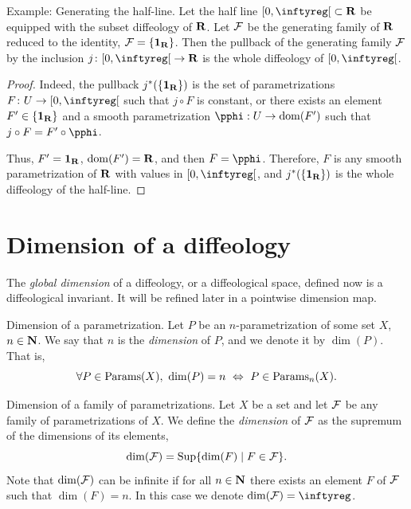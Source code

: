 \begin{Article}{Example: Generating the half-line.}{}
  Let the half line $\LeftClosedInterval{0, \infty} \subset \RR$ be equipped with the subset diffeology of $\mathbf{R}$.
  Let $\mathcal{F}$ be the generating family of $\mathbf{R}$ reduced to the identity,
  $\mathcal{F} = \{{\mathbf{1}}_{\mathbf{R}}\}$.
  Then the pullback of the generating family $\mathcal{F}$ by the inclusion $j \colon \LeftClosedInterval{0, \infty} \to \RR$ is the whole diffeology of $\LeftClosedInterval{0, \infty}$.
\end{Article}

\begin{proof}
  Indeed,
  the pullback $j^*(\{{\mathbf{1}}_{\mathbf{R}}\})$ is the set of parametrizations $F \colon U \to \LeftClosedInterval{0,\infty}$ such that $j \circ F$ is constant,
  or there exists an element $F' \in \{{\mathbf{1}}_{\mathbf{R}}\}$ and a smooth parametrization $\pphi : U \to \Domain(F')$ such that $j \circ F = F' \circ \pphi$.
  
  Thus,
  $F' = {\mathbf{1}}_{\mathbf{R}}$,
  $\mathrm{dom}(F') = \mathbf{R}$, and then $F = \pphi$.
  Therefore,
  $F$ is any smooth parametrization of $\mathbf{R}$ with values in $\LeftClosedInterval{0,\infty}$,
  and $j^*(\{{\mathbf{1}}_{\mathbf{R}}\})$ is the whole diffeology of the half-line.
\end{proof}

\section{Dimension of a diffeology}

The \emph{global dimension} of a diffeology, or a diffeological space,
defined now is a diffeological invariant.
It will be refined later in a pointwise dimension map.

\begin{Article}{Dimension of a parametrization.}{}
  \label{Dimension-of-a-parametrization}
  Let $P$ be an $n$-parametrization of some set $X$,
  $n \in \mathbf{N}$.
  We say that $n$ is the \emph{dimension} of $P$,
  and we denote it by $\dim(P)$.
  That is,
  $$%
    \forall P \in \Params(X), \ \dim(P) = n \ \Leftrightarrow
    \ P \in \Params_n(X).
    $$%
\end{Article}

\begin{Article}{Dimension of a family of parametrizations.}{}
  Let $X$ be a set and let $\mathcal{F}$ be any family of parametrizations of $X$.
  We define the \emph{dimension} of $\mathcal{F}$ as the supremum of the dimensions of its elements,
  $$%
    \dim(\cF) = \Sup \{ \dim(F) \mid F \in  \cF \}.
    $$%
  Note that $\dim(\mathcal{F})$ can be infinite if for all $n \in \mathbf{N}$ there exists an element $F$ of $\mathcal{F}$ such that $\dim(F) = n$.
  In this case we denote $\dim(\cF) = \infty$.
\end{Article}

